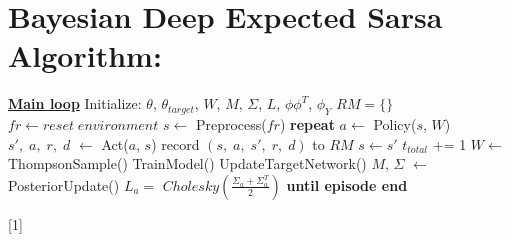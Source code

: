 \documentclass{article}
\begin{document}
\section{Bayesian Deep Expected Sarsa Algorithm:}
\begin{algorithm}
    \begin{algorithmic}
    \State \textbf{\underline{Main loop}}
        \State Initialize: $\theta$, $\theta_{target}$, $W$, $M$, $\Sigma$, $L$, $\phi\phi^T$, $\phi_Y$
        \State $RM = \{\}$
            \State $ fr \gets reset\;environment$
            \State $ s \gets$ Preprocess($fr$)
            \State \textbf{repeat}
                \State $a \gets$ Policy($s$, $W$)
                \State $s',\;a,\;r,\;d$ $\gets$ Act($a$, $s$)
                \State record $(s,\;a,\;s',\;r,\;d)$ to $RM$
                \State $s \gets s'$
                \State $t_{total}$ += 1
                    \State $W \gets$ ThompsonSample()
                \EndIf
                    \State TrainModel()
                \EndIf
                    \State UpdateTargetNetwork()
                        \State $M$, $\Sigma$ $\gets$ PosteriorUpdate()
                            \State$L_a =$ $Cholesky(\frac{\Sigma_a + \Sigma_a^T}{2})$
                        \EndFor
                    \EndIf
                \EndIf
            \State \textbf{until episode end}
        \EndFor
    \end{algorithmic}[1]
\end{algorithm}
\end{document}
